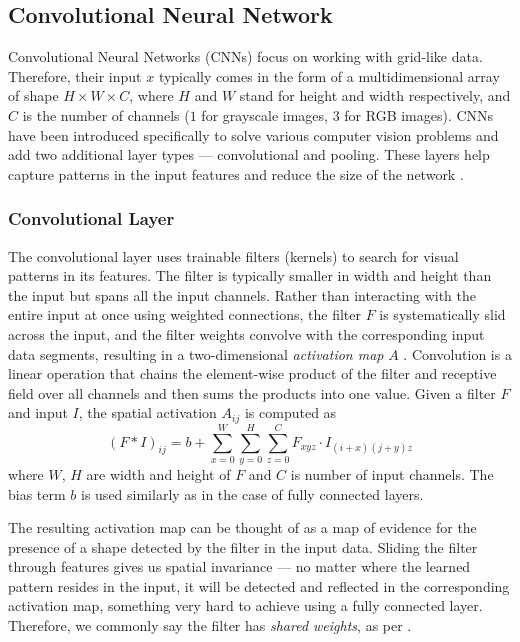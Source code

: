 \subsection*{Convolutional Neural Network}
Convolutional Neural Networks (CNNs) focus on working with grid-like data.
Therefore, their input $x$ typically comes in the form of a multidimensional array of shape $H \times W \times C$, where $H$ and $W$ stand for height and width respectively, and $C$ is the number of channels ($1$ for grayscale images, $3$ for RGB images).
CNNs have been introduced specifically to solve various computer vision problems and add two additional layer types --- convolutional and pooling.
These layers help capture patterns in the input features and reduce the size of the network \cite{cnns}. 

\subsubsection{Convolutional Layer}

The convolutional layer uses trainable filters (kernels) to search for visual patterns in its features.
The filter is typically smaller in width and height than the input but spans all the input channels.
Rather than interacting with the entire input at once using weighted connections, the filter $F$ is systematically slid across the input, and the filter weights convolve with the corresponding input data segments, resulting in a two-dimensional \emph{activation map} $A$ \cite{goodfellow}.
Convolution is a linear operation that chains the element-wise product of the filter and receptive field over all channels and then sums the products into one value. Given a filter $F$ and input $I$, the spatial activation $A_{ij}$ is computed as 
\begin{equation}
    (F * I)_{ij} = b + \sum_{x=0}^{W} \sum_{y=0}^{H} \sum_{z=0}^{C} F_{xyz} \cdot I_{(i+x)(j+y)z}
\end{equation}
where $W$, $H$ are width and height of $F$ and $C$ is number of input channels. The bias term $b$ is used similarly as in the case of fully connected layers.

The resulting activation map can be thought of as a map of evidence for the presence of a shape detected by the filter in the input data.
Sliding the filter through features gives us spatial invariance --- no matter where the learned pattern resides in the input, it will be detected and reflected in the corresponding activation map, something very hard to achieve using a fully connected layer.
Therefore, we commonly say the filter has \emph{shared weights}, as per \cite{goodfellow}.

